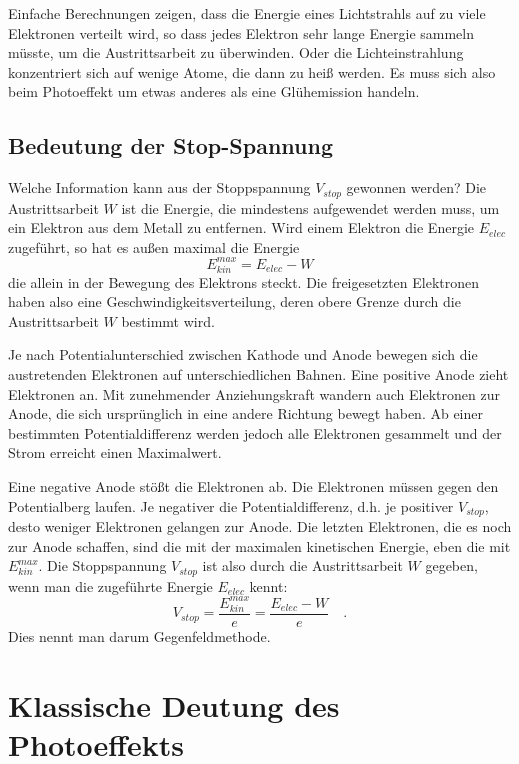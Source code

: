 Einfache Berechnungen zeigen, dass die Energie eines Lichtstrahls auf zu viele Elektronen verteilt wird, so dass jedes Elektron sehr lange Energie sammeln müsste, um die Austrittsarbeit zu überwinden. Oder die Lichteinstrahlung konzentriert sich auf wenige Atome, die dann zu heiß werden. Es muss sich also beim Photoeffekt um etwas anderes als eine Glühemission handeln.

\subsection{Bedeutung der Stop-Spannung}

Welche Information kann aus der Stoppspannung $V_{stop}$ gewonnen werden? Die Austrittsarbeit $W$ ist die Energie, die mindestens aufgewendet werden muss, um ein Elektron aus dem Metall zu entfernen. Wird einem Elektron die Energie $E_{elec}$ zugeführt, so hat es außen maximal die Energie 
\begin{equation}
    E_{kin}^{max} = E_{elec} - W
\end{equation}
die allein in der Bewegung des Elektrons steckt. Die freigesetzten Elektronen haben also eine Geschwindigkeitsverteilung, deren obere Grenze durch die Austrittsarbeit $W$ bestimmt wird.

Je nach Potentialunterschied zwischen Kathode und Anode bewegen sich die austretenden Elektronen auf unterschiedlichen Bahnen. Eine positive Anode zieht Elektronen an. Mit zunehmender Anziehungskraft wandern auch Elektronen zur Anode, die sich ursprünglich in eine andere Richtung bewegt haben. Ab einer bestimmten Potentialdifferenz werden jedoch alle Elektronen gesammelt und der Strom erreicht einen Maximalwert.

Eine negative Anode stößt die Elektronen ab. Die Elektronen müssen gegen den Potentialberg laufen. Je negativer die Potentialdifferenz, d.h. je positiver $V_{stop}$, desto weniger Elektronen gelangen zur Anode. Die letzten Elektronen, die es noch zur Anode schaffen, sind die mit der maximalen kinetischen Energie, eben die mit $ E_{kin}^{max}$. Die Stoppspannung $V_{stop}$ ist also durch die Austrittsarbeit $W$ gegeben, wenn man die zugeführte Energie $E_{elec}$ kennt:
\begin{equation}
    V_{stop} = \frac{E_{kin}^{max}}{e} = \frac{E_{elec} - W}{e}  \quad .
\end{equation}
Dies nennt man darum Gegenfeldmethode.




\section{Klassische Deutung des Photoeffekts}

